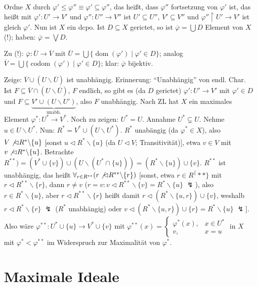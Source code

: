 \documentclass[headsepline=true,DIV=11]{scrartcl}
\theoremstyle{definition}
\renewcommand{\bar}[1]{\overline{#1}}
\newcommand{\dom}{\operatorname{dom}}
\newcommand{\codom}{\operatorname{codom}}
\begin{document}
Ordne $X$ durch $\varphi'\le\varphi''\equiv \varphi'\subseteq\varphi''$, das heißt, dass $\varphi''$ fortsetzung von $\varphi'$ ist, das heißt mit
$\varphi':U'\rightarrow V'$ und $\varphi'':U''\rightarrow V''$ ist $U'\subseteq U''$, $V'\subseteq V''$ und $\varphi''\upharpoonright U'\rightarrow
V'$ ist gleich $\varphi'$. Nun ist $X$ ein dcpo. Ist $D\subseteq X$ gerictet, so ist $\bar{\varphi}=\bigcup D$ Element von $X$ (!); haben: $\bar{\varphi}=\bigvee D$.

Zu (!): $\bar{\varphi}:\bar{U}\rightarrow\bar{V}$ mit $\bar{U}=\bigcup\{\dom(\varphi')\mid \varphi'\in D\}$; analog
$\bar{V}=\bigcup\{\codom(\varphi')\mid \varphi'\in D\}$; klar: $\bar{\varphi}$ bijektiv.

Zeige: $\bar{V}\cup(U\backslash\bar{U})$ ist unabhängig. Erinnerung: ``Unabhängig'' von endl. Char. Ist $F\subseteq \bar{V}\cap(U\backslash\bar{U})$,
$F$ endlich, so gibt es (da $D$ gerictet) $\varphi':U'\rightarrow V'$ mit $\varphi'\in D$ und $F\subseteq \underbrace{V'\cup(U\backslash
  U')}_{\mbox{unabh.}}$, also $F$ unabhängig. Nach ZL hat $X$ ein maximales Element $\varphi^*:U^*\rightarrow V^*$. Noch zu zeigen: $U^*=U$. Annahme
$U^*\subsetneq U$. Nehme $u\in U\backslash U^*$. Nun: $R^*=V^*\cup(U\backslash U^*)$. $R^*$ unabängig (da $\varphi^*\in X$), also $V\not\lhd
R^*\backslash\{u\}$ [sonst $u\lhd R^*\backslash\{u\}$ (da $U\lhd V$; Transitivität)], etwa $v\in V$ mit $v\not\lhd R^*\backslash\{u\}$. Betrachte
$R^{**})=(V^*\cup\{v\})\cup(U\backslash(U^*\cap\{u\}))=(R^*\backslash\{u\})\cup\{v\}$. $R^{**}$ ist unabhängig, das heißt $\forall_{r\in
  R^{**}}(r\not\lhd R^{**}\backslash\{r\})$ [sonst, etwa $r\in R^\{**\}$ mit $r\lhd R^{**}\backslash\{r\}$, dann $r\neq v$ ($r=v: v\lhd
  R^{**}\backslash\{v\}=R^*\backslash\{u\}$ $\lightning$), also $r\in R^*\backslash\{u\}$, aber $r\lhd R^{**}\backslash\{r\}$ heißt damit $r\lhd
  (R^*\backslash\{u,r\})\cup\{v\}$, weshalb $r\lhd R^*\backslash\{r\}$ $\lightning$ ($R^*$ unabhängig) oder
  $v\lhd(R^*\backslash\{u,r\})\cup\{r\}=R^*\backslash\{u\}$ $\lightning$]. Also wäre $\varphi^{**}:U^*\cup\{u\}\rightarrow V^*\cup\{v\}$ mit
$\varphi^{**}(x) = \left\{ \begin{array}{rl} \varphi^*(x),& x\in U^* \\ v,& x = u \end{array}\right.$ in $X$ mit $\varphi^* < \varphi^{**}$ im
Widerspruch zur Maximalität von $\varphi^*$.

\section{Maximale Ideale}
\end{document}
